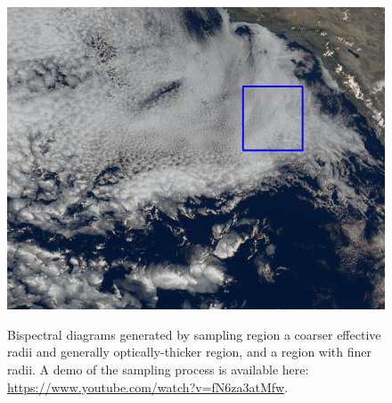 \documentclass[12pt]{article}
\begin{document}
\begin{figure}[h!]
\begin{center}
{            \includegraphics[width=.32\paperwidth]{figs/bispec_seabreeze_domain.png}
        }
    \end{center}
    \caption{Bispectral diagrams generated by sampling region a coarser effective radii and generally optically-thicker region, and a region with finer radii. A demo of the sampling process is available here: \href{https://www.youtube.com/watch?v=fN6za3atMfw}{https://www.youtube.com/watch?v=fN6za3atMfw}.}
    \label{bispec_samples}
\end{figure}
\end{document}

